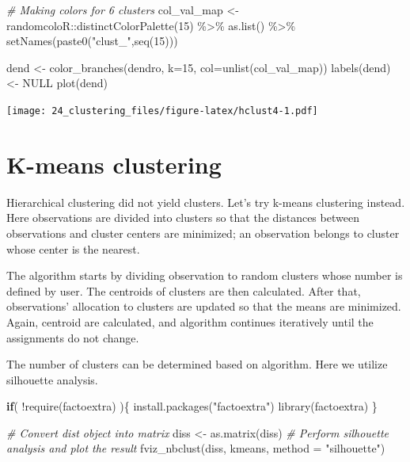 \documentclass[
]{book}
\newenvironment{Shaded}{\begin{snugshade}}{\end{snugshade}}
\newcommand{\AttributeTok}[1]{\textcolor[rgb]{0.77,0.63,0.00}{#1}}
\newcommand{\CommentTok}[1]{\textcolor[rgb]{0.56,0.35,0.01}{\textit{#1}}}
\newcommand{\ConstantTok}[1]{\textcolor[rgb]{0.00,0.00,0.00}{#1}}
\newcommand{\ControlFlowTok}[1]{\textcolor[rgb]{0.13,0.29,0.53}{\textbf{#1}}}
\newcommand{\DecValTok}[1]{\textcolor[rgb]{0.00,0.00,0.81}{#1}}
\newcommand{\FunctionTok}[1]{\textcolor[rgb]{0.00,0.00,0.00}{#1}}
\newcommand{\NormalTok}[1]{#1}
\newcommand{\OtherTok}[1]{\textcolor[rgb]{0.56,0.35,0.01}{#1}}
\newcommand{\SpecialCharTok}[1]{\textcolor[rgb]{0.00,0.00,0.00}{#1}}
\newcommand{\StringTok}[1]{\textcolor[rgb]{0.31,0.60,0.02}{#1}}
\begin{document}
\begin{Shaded}
\begin{Highlighting}[]
\CommentTok{\# Making colors for 6 clusters}
\NormalTok{col\_val\_map }\OtherTok{\textless{}{-}}\NormalTok{ randomcoloR}\SpecialCharTok{::}\FunctionTok{distinctColorPalette}\NormalTok{(}\DecValTok{15}\NormalTok{) }\SpecialCharTok{\%\textgreater{}\%}
     \FunctionTok{as.list}\NormalTok{() }\SpecialCharTok{\%\textgreater{}\%} \FunctionTok{setNames}\NormalTok{(}\FunctionTok{paste0}\NormalTok{(}\StringTok{"clust\_"}\NormalTok{,}\FunctionTok{seq}\NormalTok{(}\DecValTok{15}\NormalTok{)))}

\NormalTok{dend }\OtherTok{\textless{}{-}} \FunctionTok{color\_branches}\NormalTok{(dendro, }\AttributeTok{k=}\DecValTok{15}\NormalTok{, }\AttributeTok{col=}\FunctionTok{unlist}\NormalTok{(col\_val\_map))}
\FunctionTok{labels}\NormalTok{(dend) }\OtherTok{\textless{}{-}} \ConstantTok{NULL}
\FunctionTok{plot}\NormalTok{(dend)}
\end{Highlighting}
\end{Shaded}

\texttt{[image: 24\_clustering\_files/figure-latex/hclust4-1.pdf]}

\hypertarget{k-means-clustering}{%
\section{K-means clustering}\label{k-means-clustering}}

Hierarchical clustering did not yield clusters. Let's try k-means
clustering instead. Here observations are divided into clusters so
that the distances between observations and cluster centers are
minimized; an observation belongs to cluster whose center is the
nearest.

The algorithm starts by dividing observation to random clusters whose
number is defined by user. The centroids of clusters are then
calculated. After that, observations' allocation to clusters are
updated so that the means are minimized. Again, centroid are
calculated, and algorithm continues iteratively until the assignments
do not change.

The number of clusters can be determined based on algorithm. Here we
utilize silhouette analysis.

\begin{Shaded}
\begin{Highlighting}[]
\ControlFlowTok{if}\NormalTok{( }\SpecialCharTok{!}\FunctionTok{require}\NormalTok{(factoextra) )\{}
    \FunctionTok{install.packages}\NormalTok{(}\StringTok{"factoextra"}\NormalTok{)}
    \FunctionTok{library}\NormalTok{(factoextra)}
\NormalTok{\}}

\CommentTok{\# Convert dist object into matrix}
\NormalTok{diss }\OtherTok{\textless{}{-}} \FunctionTok{as.matrix}\NormalTok{(diss)}
\CommentTok{\# Perform silhouette analysis and plot the result}
\FunctionTok{fviz\_nbclust}\NormalTok{(diss, kmeans, }\AttributeTok{method =} \StringTok{"silhouette"}\NormalTok{)}
\end{Highlighting}
\end{Shaded}
\end{document}
